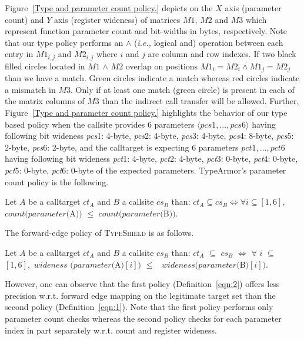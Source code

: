 Figure~\ref{Type and parameter count policy.} depicts
on the $X$ axis (parameter count) and $Y$ axis (register wideness) of matrices $M1$, $M2$ and $M3$ which represent function parameter count 
and bit-widths in bytes, respectively.
Note that our type policy performs an $\wedge$ (\textit{i.e.,} logical and) operation
between each entry in $M1_{i,j}$ and $M2_{i,j}$ where $i$ and $j$ are column and row indexes. 
If two black filled circles located in $M1$ $\wedge$ $M2$ overlap on positions $M1_{i} = M2_{i} \wedge M1_{j} = M2_{j}$ than we have a match.
Green circles indicate a match whereas red circles indicate a mismatch in $M3$.
Only if at least one match (green circle) is present in each of the matrix columns of 
$M3$ than the indirect call transfer will be allowed.
Further, Figure~\ref{Type and parameter count policy.} highlights
the behavior of our type based policy
when the callsite provides 6 parameters $\langle pcs1, ..., pcs6 \rangle$ having following bit 
wideness \textit{pcs}1: 4-byte, \textit{pcs}2: 4-byte, \textit{pcs}3: 4-byte, \textit{pcs}4: 8-byte, \textit{pcs}5: 2-byte, 
\textit{pcs}6: 2-byte, and the calltarget is expecting 6 parameters $pct1, ..., pct6$ having following bit 
wideness \textit{pct}1: 4-byte, \textit{pct}2: 4-byte, \textit{pct}3: 0-byte, \textit{pct}4: 0-byte, \textit{pct}5: 0-byte, 
\textit{pct}6: 0-byte of the expected parameters. 
TypeArmor's parameter count policy is the following.

\begin{definition}
 \label{eqn:2}Let $A$ be a calltarget $ct_{A}$ and $B$ a callsite $cs_{B}$ than: 
$ct_{A} \subseteq cs_{B} \iff \forall i \subseteq [1, 6],$ 
$count(parameter($A$))$ $\leq$ $count(parameter($B$))$.
\end{definition}
The forward-edge policy of \textsc{TypeShield} is as follows.
\begin{definition}
\label{eqn:1} Let $A$ be a calltarget $ct_{A}$ and $B$ a callsite $cs_{B}$ than: 
$ct_{A}$ $\subseteq$ $cs_{B}$ $\iff$ $\forall$ $i$ $\subseteq$ $[1, 6],$
$wideness$ $(parameter($A$)[i])$ $\leq$ \ $wideness (parameter($B$)[i])$.
\end{definition}

However, one can observe that the first policy (Definition~\ref{eqn:2}) offers less precision w.r.t. forward edge mapping on the legitimate target set
than the second policy (Definition~\ref{eqn:1}). Note that the first policy performs 
only parameter count checks whereas the second policy checks for each parameter index in part separately w.r.t. count and register wideness.

